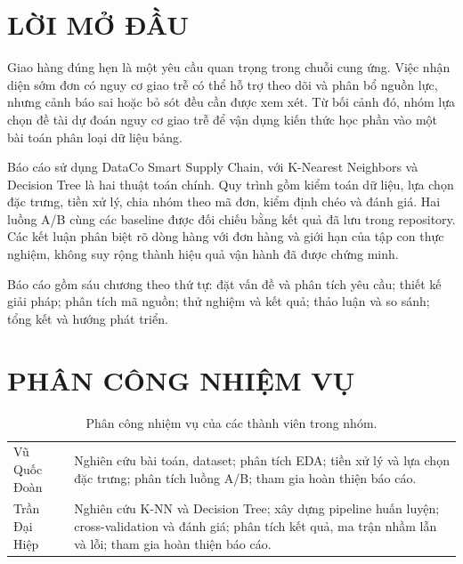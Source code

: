 \section*{LỜI MỞ ĐẦU}
Giao hàng đúng hẹn là một yêu cầu quan trọng trong chuỗi cung ứng. Việc
nhận diện sớm đơn có nguy cơ giao trễ có thể hỗ trợ theo dõi và phân bổ
nguồn lực, nhưng cảnh báo sai hoặc bỏ sót đều cần được xem xét. Từ bối
cảnh đó, nhóm lựa chọn đề tài dự đoán nguy cơ giao trễ để vận dụng kiến
thức học phần vào một bài toán phân loại dữ liệu bảng.

Báo cáo sử dụng DataCo Smart Supply Chain, với K-Nearest Neighbors và
Decision Tree là hai thuật toán chính. Quy trình gồm kiểm toán dữ liệu,
lựa chọn đặc trưng, tiền xử lý, chia nhóm theo mã đơn, kiểm định chéo và
đánh giá. Hai luồng A/B cùng các baseline được đối chiếu bằng kết quả
đã lưu trong repository. Các kết luận phân biệt rõ dòng hàng với đơn
hàng và giới hạn của tập con thực nghiệm, không suy rộng thành hiệu quả
vận hành đã được chứng minh.

Báo cáo gồm sáu chương theo thứ tự: đặt vấn đề và phân tích yêu cầu;
thiết kế giải pháp; phân tích mã nguồn; thử nghiệm và kết quả; thảo luận
và so sánh; tổng kết và hướng phát triển.

\section*{PHÂN CÔNG NHIỆM VỤ}
\begin{table}[!htbp]\centering\small
\caption{Phân công nhiệm vụ của các thành viên trong nhóm.}\label{tab:team-assignment}
\begin{tabularx}{\linewidth}{|p{3.6cm}|Y|}\hline
{} & \\\hline
Vũ Quốc Đoàn & Nghiên cứu bài toán, dataset; phân tích EDA; tiền xử lý và lựa chọn đặc trưng; phân tích luồng A/B; tham gia hoàn thiện báo cáo.\\[7pt]
Trần Đại Hiệp & Nghiên cứu K-NN và Decision Tree; xây dựng pipeline huấn luyện; cross-validation và đánh giá; phân tích kết quả, ma trận nhầm lẫn và lỗi; tham gia hoàn thiện báo cáo.\\\hline
\end{tabularx}
\end{table}
